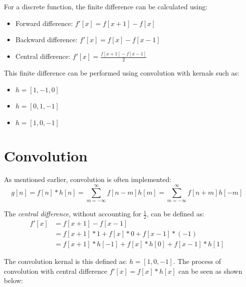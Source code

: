 \documentclass{report}
\begin{document}
For a discrete function, the finite difference can be calculated using:
\begin{itemize}
    \item Forward difference: $f'[x] = f[x+1] - f[x]$
    \item Backward difference: $f'[x] = f[x] - f[x-1]$
    \item Central difference: $f'[x] = \frac{f[x+1] - f[x-1]}{2}$
\end{itemize}

This finite difference can be performed using convolution with kernals such as:
\begin{itemize}
    \item $h=[1,-1,0]$
    \item $h=[0,1,-1]$
    \item $h=[1,0,-1]$
\end{itemize}

\section{Convolution}

As mentioned earlier, convolution is often implemented:
$$
    g[n] = f[n] * h[n] = \sum_{m=-\infty}^\infty f[n-m]h[m] = \sum_{m=-\infty}^\infty f[n+m]h[-m]
$$

The \textit{central difference}, without accounting for $\frac{1}{2}$, can be
defined as:
\begin{align*}
    f'[x] &= f[x+1] - f[x-1] \\
    &= f[x+1] *1 + f[x] * 0 + f[x-1] * (-1) \\
    &= f[x+1] * h[-1] + f[x] * h[0] + f[x-1] * h[1] 
\end{align*}

The convolution kernal is this defined as: $h = [1,0,-1]$. The process of
convolution with central difference $f'[x] = f[x] * h[x]$ can be seen as shown below: 
\begin{figure}[h]
    \centering
    \qquad
\end{figure}
\end{document}
